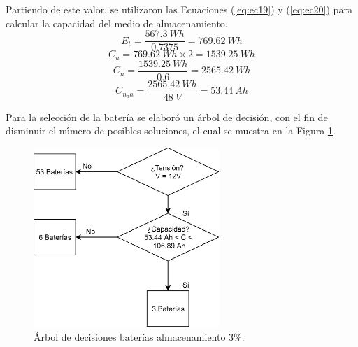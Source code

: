 Partiendo de este valor, se utilizaron las Ecuaciones (\ref{eq:ec19}) y (\ref{eq:ec20}) para calcular la capacidad del medio de almacenamiento.
\begin{equation}\label{eq:ec9sust1}
E_{t} = \frac{567.3 \ Wh}{0.7375}=769.62 \ Wh
\end{equation}
\begin{equation}\label{eq:ec11sust1}
C_{u} =769.62 \ Wh \times 2 = 1539.25 \ Wh
\end{equation}
\begin{equation}
C_{n} = \frac{1539.25 \ Wh}{0.6}=2565.42 \ Wh
\end{equation}
\begin{equation}\label{eq:ec21}
C_{n_ah} = \frac{2565.42 \ Wh}{48 \ V}=53.44 \ Ah
\end{equation}

Para la selección de la batería se elaboró un árbol de decisión, con el fin de disminuir el número de posibles soluciones, el cual se muestra en la Figura \ref{fig:Arrutbat2}. 
\begin{figure}[H]
	\centering
	\includegraphics[width=7cm]{imagenes/Arrutabat2}
	\caption{Árbol de decisiones baterías almacenamiento 3\%.}
	\label{fig:Arrutbat2}
\end{figure}

